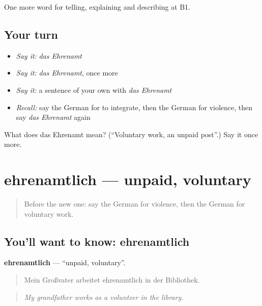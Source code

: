 \begin{grammarlens}[title={What you've built}]
One more word for telling, explaining and describing at B1.
\end{grammarlens}

\subsection*{Your turn}
\begin{itemize}
\raggedright
  \item \emph{Say it:} \emph{das Ehrenamt}
  \item \emph{Say it:} \emph{das Ehrenamt}, once more
  \item \emph{Say it:} a sentence of your own with \emph{das Ehrenamt}
  \item \emph{Recall:} say the German for to integrate, then the German for violence, then say \emph{das Ehrenamt} again
\end{itemize}

\begin{tcolorbox}[breakable,colback=teal!4,colframe=teal!35!black,title={Before you move on}]
What does das Ehrenamt mean? (\textquotedblleft{}Voluntary work, an unpaid post\textquotedblright{}.) Say it once more.
\end{tcolorbox}
\section[ehrenamtlich]{ehrenamtlich — unpaid, voluntary}

\label{lesson:GE-C362-ehrenamtlich}



\begin{quote}
Before the new one: say the German for violence, then the German for voluntary work.
\end{quote}

\subsection*{You'll want to know: ehrenamtlich}
\textbf{ehrenamtlich} — \textquotedblleft{}unpaid, voluntary\textquotedblright{}.

\begin{quote}
Mein Großvater arbeitet ehrenamtlich in der Bibliothek.
\end{quote}

\begin{quote}
\emph{My grandfather works as a volunteer in the library.}
\end{quote}

